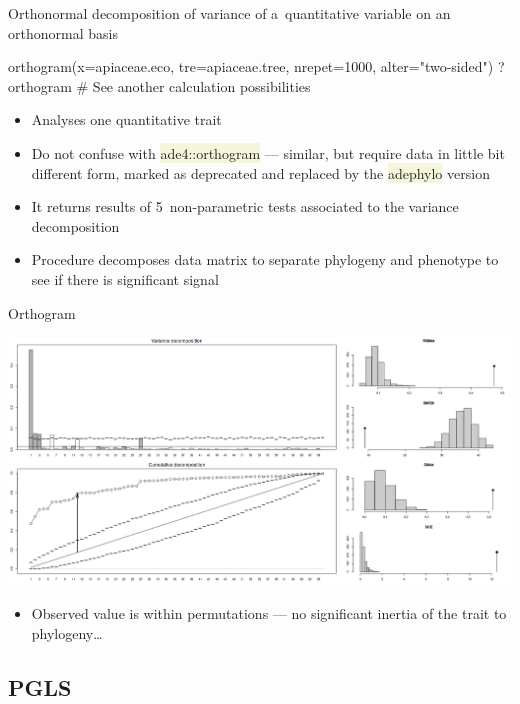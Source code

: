 \documentclass[compress, ucs, xelatex, 11pt, xcolor=svgnames, aspectratio=169,
	hyperref={
		bookmarks=true,
		unicode=true,
		colorlinks=true,
		pdftitle={Molecular data in R},
		plainpages=false,
		pdfauthor={Vojtech Zeisek},
		pdfsubject={Course about phylogeny and evolution in R},
		pdfcreator={XeLaTeX},
		pdfkeywords={R, evolution, phylogeny, molecular data},
		linkcolor=Crimson, %
		anchorcolor=Magenta, %
		citecolor=Magenta, %
		filecolor=Magenta, %
		menucolor=Magenta, %
		urlcolor=DodgerBlue, %
		pdftex},
	url={hyphens, lowtilde} %
	]{beamer}
\renewcommand{\texttt}[1]{\colorbox{Beige}{{\ttfamily #1}}}
\begin{document}
\begin{frame}[fragile]{Orthonormal decomposition of variance of a~quantitative variable on an orthonormal basis}
	\begin{spluscode}
    orthogram(x=apiaceae.eco, tre=apiaceae.tree, nrepet=1000,
      alter="two-sided")
    ?orthogram # See another calculation possibilities
	\end{spluscode}
	\begin{itemize}
		\item Analyses one quantitative trait
		\item Do not confuse with \texttt{ade4::orthogram} --- similar, but require data in little bit different form, marked as deprecated and replaced by the \texttt{adephylo} version
		\item It returns results of 5~non-parametric tests associated to the variance decomposition
		\item Procedure decomposes data matrix to separate phylogeny and phenotype to see if there is significant signal
	\end{itemize}
\end{frame}

\begin{frame}{Orthogram}
	\begin{center}
		\includegraphics[width=\textwidth-4cm]{orthogram.png}
	\end{center}
	\begin{itemize}
		\item Observed value is within permutations --- no significant inertia of the trait to phylogeny\ldots
	\end{itemize}
\end{frame}

\subsection{PGLS}
\end{document}
